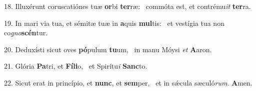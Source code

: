 18. Illuxérunt coruscatiónes tuæ \textbf{or}bi \textbf{ter}ræ: \ast\  commóta est, et contrému\textit{it} \textbf{ter}ra.\

19. In mari via tua, et sémitæ tuæ in \textbf{a}quis \textbf{mul}tis: \ast\  et vestígia tua non co\textit{gno}\textbf{scén}tur.\

20. Deduxísti sicut oves \textbf{pó}pulum \textbf{tu}um, \ast\  in manu Móysi \textit{et} \textbf{A}aron.\

21. Glória \textbf{Pa}tri, et \textbf{Fí}\textbf{li}o, \ast\  et Spirítu\textit{i} \textbf{Sanc}to.\

22. Sicut erat in princípio, et \textbf{nunc}, et \textbf{sem}per, \ast\  et in sǽcula sæculó\textit{rum}. \textbf{A}men.\

